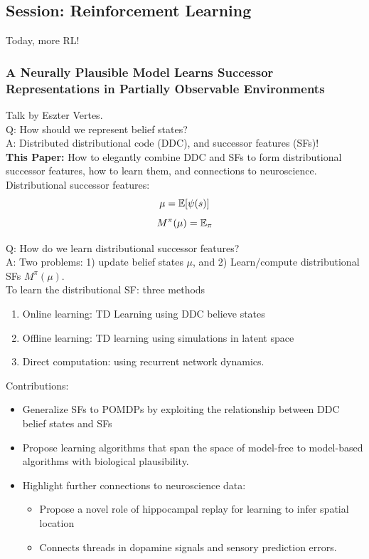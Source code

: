 
\subsection{Session: Reinforcement Learning}
Today, more RL!
\subsubsection{A Neurally Plausible Model Learns Successor Representations in Partially Observable Environments \cite{vertes2019neurally}}

Talk by Eszter Vertes. \\

Q: How should we represent belief states? \\

A:  Distributed distributional code (DDC), and successor features (SFs)! \\

{\bf This Paper:} How to elegantly combine DDC and SFs to form distributional successor features, how to learn them, and connections to neuroscience. \\

Distributional successor features:
\[
\mu = \mathbb{E}[\psi(s)]
\]
\[
M^{\pi}(\mu) = \mathbb{E}_\pi
\]

Q: How do we learn distributional successor features? \\

A: Two problems: 1) update belief states $\mu$, and 2) Learn/compute distributional SFs $M^{\pi}(\mu)$. \\

To learn the distributional SF: three methods
\begin{enumerate}
    \item Online learning: TD Learning using DDC believe states
    \item Offline learning: TD learning using simulations in latent space 
    \item Direct computation: using recurrent network dynamics.
\end{enumerate}

Contributions:
\begin{itemize}
    \item Generalize SFs to POMDPs by exploiting the relationship between DDC belief states and SFs
    \item Propose learning algorithms that span the space of model-free to model-based algorithms with biological plausibility.
    \item Highlight further connections to neuroscience data:
    \begin{itemize}
        \item Propose a novel role of hippocampal replay for learning to infer spatial location
        \item Connects threads in dopamine signals and sensory prediction errors.
    \end{itemize}
\end{itemize}


